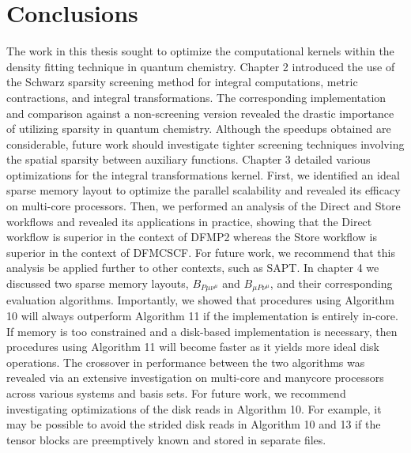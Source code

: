 \chapter{Conclusions}

The work in this thesis sought to optimize the computational kernels within the density fitting technique in quantum chemistry.
Chapter 2 introduced the use of the Schwarz sparsity screening method for integral computations, metric contractions, and integral transformations.
The corresponding implementation and comparison against a non-screening version revealed the drastic importance of 
utilizing sparsity in quantum chemistry. Although the speedups obtained are considerable, future work should investigate tighter screening techniques
involving the spatial sparsity between auxiliary functions. 
Chapter 3 detailed various optimizations for the integral transformations kernel. First, we identified an ideal sparse memory layout to 
optimize the parallel scalability and revealed its efficacy on multi-core processors. Then, we performed an analysis of 
the Direct and Store workflows and revealed its applications in practice, showing that the Direct workflow is superior in 
the context of DFMP2 whereas the Store workflow is superior in the context of DFMCSCF. 
For future work, we recommend that this analysis be applied further to other contexts, such as
SAPT. In chapter 4 we discussed two sparse memory layouts, $B_{P \mu \nu^{\mu}}$ and $B_{\mu P \nu^{\mu}}$, and their corresponding
evaluation algorithms. Importantly, we showed that procedures using Algorithm 10 will always outperform Algorithm 11 if the implementation is entirely in-core.
If memory is too constrained and a disk-based implementation is necessary, then procedures using Algorithm 11 will become faster 
as it yields more ideal disk operations. The crossover in performance between the two algorithms was revealed via an extensive investigation on
multi-core and manycore processors across various systems and basis sets. For future work, we recommend investigating optimizations of the disk reads
in Algorithm 10. For example, it may be possible to avoid the strided disk reads in Algorithm 10 and 13 if the tensor blocks are preemptively known and
stored in separate files. 


